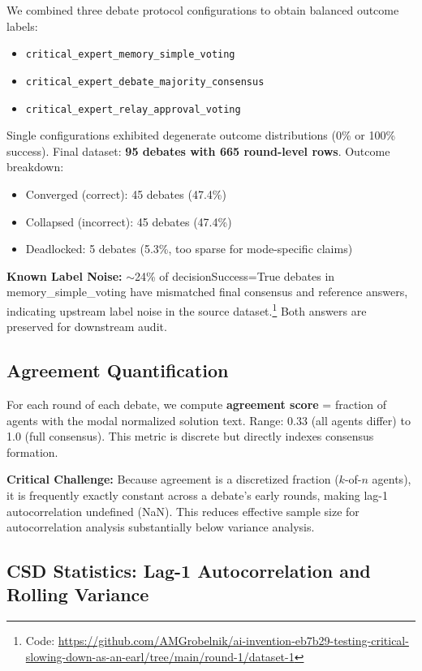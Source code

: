 \documentclass[11pt,letterpaper]{article}
\begin{document}
We combined three debate protocol configurations to obtain balanced outcome labels:
\begin{itemize}
\item \texttt{critical\_expert\_memory\_simple\_voting}
\item \texttt{critical\_expert\_debate\_majority\_consensus}
\item \texttt{critical\_expert\_relay\_approval\_voting}
\end{itemize}

Single configurations exhibited degenerate outcome distributions (0\% or 100\% success). Final dataset: \textbf{95 debates with 665 round-level rows}. Outcome breakdown:
\begin{itemize}
\item Converged (correct): 45 debates (47.4\%)
\item Collapsed (incorrect): 45 debates (47.4\%)
\item Deadlocked: 5 debates (5.3\%, too sparse for mode-specific claims)
\end{itemize}

\textbf{Known Label Noise:} $\sim$24\% of decisionSuccess=True debates in memory\_simple\_voting have mismatched final consensus and reference answers, indicating upstream label noise in the source dataset.\footnote{Code: \url{https://github.com/AMGrobelnik/ai-invention-eb7b29-testing-critical-slowing-down-as-an-earl/tree/main/round-1/dataset-1}} Both answers are preserved for downstream audit.

\subsection{Agreement Quantification}

For each round of each debate, we compute \textbf{agreement score} = fraction of agents with the modal normalized solution text. Range: 0.33 (all agents differ) to 1.0 (full consensus). This metric is discrete but directly indexes consensus formation.

\textbf{Critical Challenge:} Because agreement is a discretized fraction ($k$-of-$n$ agents), it is frequently exactly constant across a debate's early rounds, making lag-1 autocorrelation undefined (NaN). This reduces effective sample size for autocorrelation analysis substantially below variance analysis.

\subsection{CSD Statistics: Lag-1 Autocorrelation and Rolling Variance}
\end{document}
